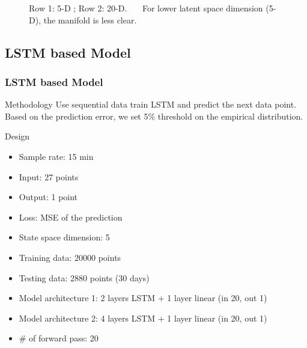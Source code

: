 \documentclass{beamer}
\begin{document}
\begin{frame}
\begin{frame}
\begin{frame}
\begin{frame}
\begin{frame}
\begin{figure}
\vspace{-0.2in}
\caption{Row 1: 5-D ; Row 2: 20-D. \ \ \ For lower latent space dimension (5-D), the manifold is less clear.}
\end{figure}
\end{frame}




\subsection{LSTM based Model}
\begin{frame}
\frametitle{LSTM based Model}

\begin{block}{Methodology}
Use sequential data train LSTM and predict the next data point. Based on the prediction error, we set 5\% threshold on the empirical distribution.
\end{block}

\begin{block}{Design}
\begin{itemize}
\setlength\itemsep{0em}
\item Sample rate: 15 min
\item Input: 27 points
\item Output: 1 point
\item Loss: MSE of the prediction 
\item State space dimension: 5
\item Training data: 20000 points
\item Testing data: 2880 points (30 days)
\item Model architecture 1: 2 layers LSTM + 1 layer linear (in 20, out 1)
\item Model architecture 2: 4 layers LSTM + 1 layer linear (in 20, out 1)
\item \# of forward pass: 20
\end{itemize}
\end{block}

\end{frame}


\end{frame}
\end{frame}
\end{frame}
\end{frame}
\end{document}
